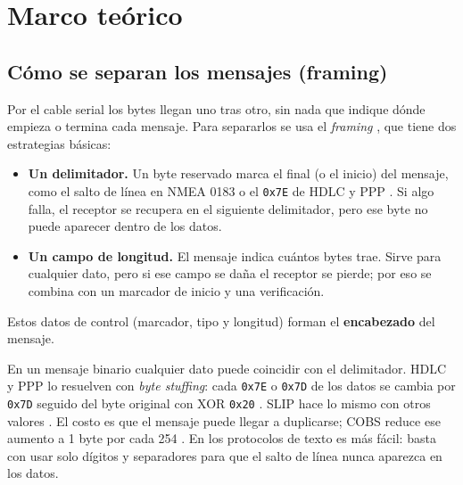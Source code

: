 \documentclass[journal]{IEEEtran}
\begin{document}
\section{Marco teórico}

\subsection{Cómo se separan los mensajes (framing)}
Por el cable serial los bytes llegan uno tras otro, sin nada que indique dónde empieza o termina cada mensaje. Para separarlos se usa el \emph{framing} \cite{tanenbaum}, que tiene dos estrategias básicas:
\begin{itemize}
    \item \textbf{Un delimitador.} Un byte reservado marca el final (o el inicio) del mensaje, como el salto de línea en NMEA 0183 \cite{nmea} o el \texttt{0x7E} de HDLC y PPP \cite{rfc1662}. Si algo falla, el receptor se recupera en el siguiente delimitador, pero ese byte no puede aparecer dentro de los datos.
    \item \textbf{Un campo de longitud.} El mensaje indica cuántos bytes trae. Sirve para cualquier dato, pero si ese campo se daña el receptor se pierde; por eso se combina con un marcador de inicio y una verificación.
\end{itemize}
Estos datos de control (marcador, tipo y longitud) forman el \textbf{encabezado} del mensaje.

En un mensaje binario cualquier dato puede coincidir con el delimitador. HDLC y PPP lo resuelven con \emph{byte stuffing}: cada \texttt{0x7E} o \texttt{0x7D} de los datos se cambia por \texttt{0x7D} seguido del byte original con XOR \texttt{0x20} \cite{rfc1662}. SLIP hace lo mismo con otros valores \cite{rfc1055}. El costo es que el mensaje puede llegar a duplicarse; COBS reduce ese aumento a 1 byte por cada 254 \cite{cobs}. En los protocolos de texto es más fácil: basta con usar solo dígitos y separadores para que el salto de línea nunca aparezca en los datos.
\end{document}
